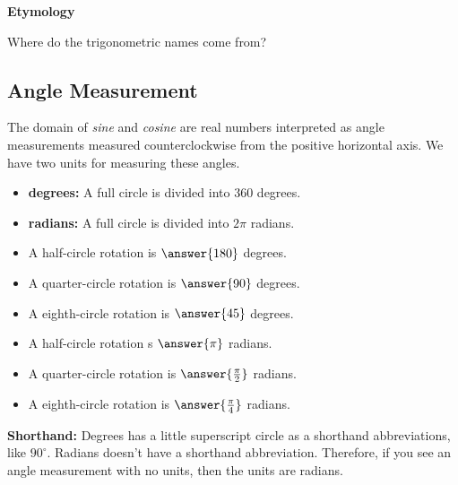 \documentclass{ximera}
\begin{document}
\begin{remark}  \textbf{\textcolor{yellow!35!black}{Etymology}}


Where do the trigonometric names come from?  

\end{remark}








\newpage

\subsection*{Angle Measurement}
\hfill\break

The domain of \textit{sine} and \textit{cosine} are real numbers interpreted as angle measurements measured counterclockwise from the positive horizontal axis.  We have two units for measuring these angles.


\begin{itemize}
\item \textbf{degrees:}  A full circle is divided into $360$ degrees.
\item \textbf{radians:}  A full circle is divided into $2\pi$ radians.
\end{itemize}


\begin{question} 


	\begin{itemize}
		\item A half-circle rotation is $\answer{180}$ degrees.
		\item A quarter-circle rotation is $\answer{90}$ degrees.
		\item A eighth-circle rotation is $\answer{45}$ degrees.
		\item A half-circle rotation s $\answer{\pi}$ radians.
		\item A quarter-circle rotation is $\answer{\frac{\pi}{2}}$ radians.
		\item A eighth-circle rotation is $\answer{\frac{\pi}{4}}$ radians.

	\end{itemize}
\end{question}


\textbf{Shorthand:}  Degrees has a little superscript circle as a shorthand abbreviations, like $90^\circ$.  Radians doesn't have a shorthand abbreviation.  Therefore, if you see an angle measurement with no units, then the units are radians. 
\end{document}
